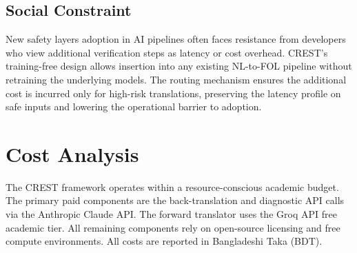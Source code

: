 \subsection{Social Constraint}
New safety layers adoption in AI pipelines often faces resistance from developers who view additional verification steps as latency or cost overhead. CREST's training-free design allows insertion into any existing NL-to-FOL pipeline without retraining the underlying models. The routing mechanism ensures the additional cost is incurred only for high-risk translations, preserving the latency profile on safe inputs and lowering the operational barrier to adoption.

\section{Cost Analysis}

The CREST framework operates within a resource-conscious academic budget. The primary paid components are the back-translation and diagnostic API calls via the Anthropic Claude API. The forward translator uses the Groq API free academic tier. All remaining components rely on open-source licensing and free compute environments. All costs are reported in Bangladeshi Taka (BDT).

